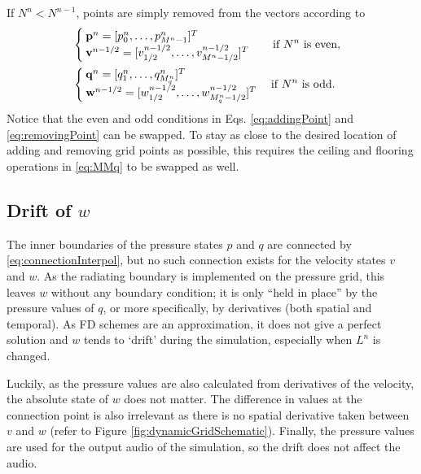 If $N^n < N^{n-1}$, points are simply removed from the vectors according to
\begin{equation}\label{eq:removingPoint}
    \begin{aligned}
        &\!\!\!\!\!\!\begin{cases}
            \mathbf{p}^n = [p_0^n, \hdots, p_{M^n-1}^n]^T\\
            \mathbf{v}^{n-1/2} = [v_{1/2}^{n-1/2}, \hdots, v_{M^n-1/2}^{n-1/2}]^T
        \end{cases}
        \quad\!\text{if $N^n$ is even},\\
        &\!\!\!\!\!\!\begin{cases}
            \mathbf{q}^n = [q_1^n, \hdots, q_{M_q^n}^n]^T\\
            \mathbf{w}^{n-1/2} = [w_{1/2}^{n-1/2},\hdots, w_{M_q^n-1/2}^{n-1/2}]^T
        \end{cases}\text{if $ N^n$ is odd}.
    \end{aligned}
\end{equation}
Notice that the even and odd conditions in Eqs. \eqref{eq:addingPoint} and \eqref{eq:removingPoint} can be swapped. To stay as close to the desired location of adding and  removing grid points as possible, this requires the ceiling and flooring operations in \eqref{eq:MMq} to be swapped as well.
\subsection{Drift of $w$}\label{sec:drift}
The inner boundaries of the pressure states $p$ and $q$ are connected by \eqref{eq:connectionInterpol}, but no such connection exists for the velocity states $v$ and $w$. As the radiating boundary is implemented on the pressure grid, this leaves $w$ without any boundary condition; it is only ``held in place'' by the pressure values of $q$, or more specifically, by derivatives (both spatial and temporal). As FD schemes are an approximation, it does not give a perfect solution and $w$ tends to `drift' during the simulation, especially when $L^n$ is changed.

Luckily, as the pressure values are also calculated from derivatives of the velocity, the absolute state of $w$ does not matter. The difference in values at the connection point is also irrelevant as there is no spatial derivative taken between $v$ and $w$ (refer to Figure \ref{fig:dynamicGridSchematic}). Finally, the pressure values are used for the output audio of the simulation, so the drift does not affect the audio. 

